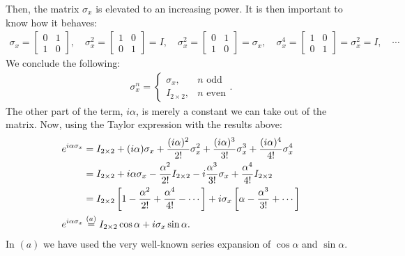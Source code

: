 \documentclass[letterpaper,11pt,twoside]{article}
\begin{document}
Then, the matrix $\sigma_x$ is elevated to an increasing power. It is then important to know how it behaves:
\begin{align*}
  \sigma_x=\begin{bmatrix}
    0&1\\1&0
  \end{bmatrix},\quad\sigma_x^2=\begin{bmatrix}
    1&0\\0&1
  \end{bmatrix}=I,\quad\sigma_x^2=\begin{bmatrix}
    0&1\\1&0
  \end{bmatrix}=\sigma_x,\quad \sigma_x^4=\begin{bmatrix}
    1&0\\0&1
  \end{bmatrix}=\sigma_x^2=I,\quad\cdots
\end{align*}
We conclude the following:
\begin{align*}
  \sigma^n_x=\begin{cases}
    \sigma_x,&\text{$n$ odd}\\
    I_{2\times2},&\text{$n$ even}
  \end{cases}.
\end{align*}
The other part of the term, $i\alpha$, is merely a constant we can take out of the matrix. Now, using the Taylor expression with the results above:
\begin{align}
  e^{i\alpha\sigma_x}&=I_{2\times2}+(i\alpha)\sigma_x+\frac{(i\alpha)^2}{2!}\sigma_x^2+\frac{(i\alpha)^3}{3!}\sigma_x^3+\frac{(i\alpha)^4}{4!}\sigma_x^4\notag\\
  &=I_{2\times2}+i\alpha\sigma_x-\frac{\alpha^2}{2!}I_{2\times2}-i\frac{\alpha^3}{3!}\sigma_x+\frac{\alpha^4}{4!}I_{2\times2}\notag\\
  &=I_{2\times2}\left[1-\frac{\alpha^2}{2!}+\frac{\alpha^4}{4!}-\cdots\right]+i\sigma_x\left[\alpha-\frac{\alpha^3}{3!}+\cdots\right]\notag\\
  e^{i\alpha\sigma_x}&\stackrel{(a)}{=}I_{2\times2}\cos\alpha+i\sigma_x\sin\alpha.
\end{align}
In $(a)$ we have used the very well-known series expansion of $\cos\alpha$ and $\sin\alpha$.
%
\end{document}
